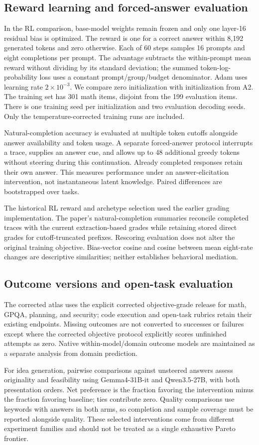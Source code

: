 \subsection{Reward learning and forced-answer evaluation}
In the RL comparison, base-model weights remain frozen and only one layer-16 residual bias is optimized. The reward is one for a correct answer within 8,192 generated tokens and zero otherwise. Each of 60 steps samples 16 prompts and eight completions per prompt. The advantage subtracts the within-prompt mean reward without dividing by its standard deviation; the summed token-log-probability loss uses a constant prompt/group/budget denominator. Adam uses learning rate $2\times10^{-3}$. We compare zero initialization with initialization from A2. The training set has 301 math items, disjoint from the 199 evaluation items. There is one training seed per initialization and two evaluation decoding seeds. Only the temperature-corrected training runs are included.

Natural-completion accuracy is evaluated at multiple token cutoffs alongside answer availability and token usage. A separate forced-answer protocol interrupts a trace, supplies an answer cue, and allows up to 48 additional greedy tokens without steering during this continuation. Already completed responses retain their own answer. This measures performance under an answer-elicitation intervention, not instantaneous latent knowledge. Paired differences are bootstrapped over tasks.

The historical RL reward and archetype selection used the earlier grading implementation. The paper's natural-completion summaries reconcile completed traces with the current extraction-based grades while retaining stored direct grades for cutoff-truncated prefixes. Rescoring evaluation does not alter the original training objective. Bias-vector cosine and cosine between mean eight-rate changes are descriptive similarities; neither establishes behavioral mediation.

\subsection{Outcome versions and open-task evaluation}
The corrected atlas uses the explicit corrected objective-grade release for math, GPQA, planning, and security; code execution and open-task rubrics retain their existing endpoints. Missing outcomes are not converted to successes or failures except where the corrected objective protocol explicitly scores unfinished attempts as zero. Native within-model/domain outcome models are maintained as a separate analysis from domain prediction.

For idea generation, pairwise comparisons against unsteered answers assess originality and feasibility using Gemma4-31B-it and Qwen3.5-27B, with both presentation orders. Net preference is the fraction favoring the intervention minus the fraction favoring baseline; ties contribute zero. Quality comparisons use keywords with answers in both arms, so completion and sample coverage must be reported alongside quality. These selected interventions come from different experiment families and should not be treated as a single exhaustive Pareto frontier.

